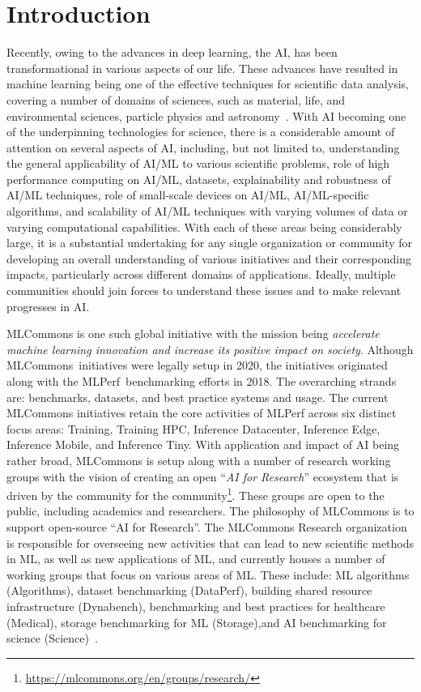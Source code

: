 \section{Introduction}
\label{sec:intro}

Recently, owing to the advances in deep learning, the AI, has been transformational in various aspects of our life. These advances have resulted in machine learning being one of the effective techniques for scientific data analysis, covering a number of domains of sciences, such as material, life, and environmental sciences, particle physics and astronomy~\cite{jtmnras1,jtmnras2,natrev:jeyan,roysoc:tonyhey,2020:callaway,2021:jumper,tanaka:2021}. With AI becoming one of the underpinning technologies for science, there is a considerable amount of attention on several aspects of AI, including, but not limited to, understanding the general applicability of AI/ML to various scientific problems, role of high performance computing on AI/ML, datasets, explainability and robustness of  AI/ML techniques, role of small-scale devices on AI/ML, AI/ML-specific algorithms, and scalability of AI/ML techniques with varying volumes of data or varying computational capabilities. With each of these areas being considerably large, it is a substantial undertaking for any single organization or community for developing an overall understanding  of various initiatives and their corresponding impacts, particularly across different domains of applications. Ideally, multiple communities should join forces to understand these issues and to make relevant progresses in AI.  

MLCommons is one such global initiative with the mission being {\em accelerate machine learning
innovation and increase its positive impact on society}. Although MLCommons\texttrademark\  initiatives were legally setup in 2020, the initiatives originated along with the MLPerf\texttrademark\ benchmarking efforts in 2018. The overarching strands are: benchmarks, datasets, and best practice systems and usage. The current MLCommons initiatives retain the core activities of MLPerf across six distinct focus areas: Training, Training HPC, Inference Datacenter, Inference Edge, Inference Mobile, and Inference Tiny. With application and impact of AI being rather broad, MLCommons is setup along with a number of research working groups with the vision of creating an open ``\emph{AI for Research}'' ecosystem
that is driven by the community for the community\footnote{\url{https://mlcommons.org/en/groups/research/}}. 
These groups are open to the public, including academics and researchers. The philosophy of MLCommons is to support open-source ``AI for Research''. The MLCommons Research organization is responsible for overseeing new activities that can lead to new scientific methods in ML, as well as new applications of ML, and currently houses a number of working groups that focus on various areas of ML. These include: ML algorithms (Algorithms),  dataset benchmarking (DataPerf), building shared resource infrastructure (Dynabench), benchmarking and best practices for healthcare (Medical), storage benchmarking for ML (Storage),and AI benchmarking for science (Science)~\cite{mlcommons-science}. 

